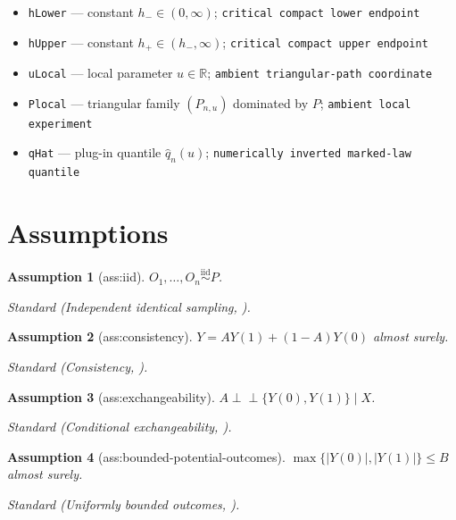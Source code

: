 \documentclass{article}
\newtheorem{assumption}{Assumption}
\begin{document}
\begin{itemize}
  \item \texttt{hLower} --- constant \(h_-\in(0,\infty)\); \texttt{critical compact lower endpoint}
  \item \texttt{hUpper} --- constant \(h_+\in(h_-,\infty)\); \texttt{critical compact upper endpoint}
  \item \texttt{uLocal} --- local parameter \(u\in\mathbb R\); \texttt{ambient triangular-\allowbreak{}path coordinate}
  \item \texttt{Plocal} --- triangular family \((P_{n,u})\) dominated by \(P\); \texttt{ambient local experiment}
  \item \texttt{qHat} --- plug-in quantile \(\widehat q_n(u)\); \texttt{numerically inverted marked-\allowbreak{}law quantile}
\end{itemize}

\section{Assumptions}

\begin{assumption}[ass:iid]\label{ass:iid}
\(O_1,\ldots,O_n\stackrel{\mathrm{iid}}{\sim}P\).
\par\smallskip\noindent\emph{Standard} (Independent identical sampling, \cite{Kennedy2019Incremental}).
\end{assumption}

\begin{assumption}[ass:consistency]\label{ass:consistency}
\(Y=AY(1)+(1-A)Y(0)\) almost surely.
\par\smallskip\noindent\emph{Standard} (Consistency, \cite{Kennedy2019Incremental}).
\end{assumption}

\begin{assumption}[ass:exchangeability]\label{ass:exchangeability}
\(A\perp\!\!\!\perp\{Y(0),Y(1)\}\mid X\).
\par\smallskip\noindent\emph{Standard} (Conditional exchangeability, \cite{Kennedy2019Incremental}).
\end{assumption}

\begin{assumption}[ass:bounded-potential-outcomes]\label{ass:bounded-potential-outcomes}
\(\max\{|Y(0)|,|Y(1)|\}\leq B\) almost surely.
\par\smallskip\noindent\emph{Standard} (Uniformly bounded outcomes, \cite{NaimiEtAl2021TimeFixed}).
\end{assumption}
\end{document}

